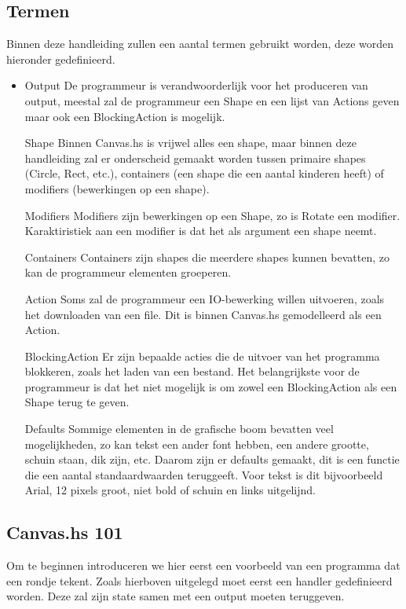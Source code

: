 \subsection{Termen}
Binnen deze handleiding zullen een aantal termen gebruikt worden, deze worden hieronder gedefinieerd.
\begin{itemize}
	\item Output
De programmeur is verandwoorderlijk voor het produceren van output, meestal zal de programmeur een Shape en een lijst van Actions geven maar ook een BlockingAction is mogelijk.
	\item[Shape]
Binnen Canvas.hs is vrijwel alles een shape, maar binnen deze handleiding zal er onderscheid gemaakt worden tussen primaire shapes (Circle, Rect, etc.), containers (een shape die een aantal kinderen heeft) of modifiers (bewerkingen op een shape).
	\item[Modifiers]
Modifiers zijn bewerkingen op een Shape, zo is Rotate een modifier. Karaktiristiek aan een modifier is dat het als argument een shape neemt.
	\item[Containers]
Containers zijn shapes die meerdere shapes kunnen bevatten, zo kan de programmeur elementen groeperen.
	\item[Action]
Soms zal de programmeur een IO-bewerking willen uitvoeren, zoals het downloaden van een file. Dit is binnen Canvas.hs gemodelleerd als een Action.
	\item[BlockingAction]
Er zijn bepaalde acties die de uitvoer van het programma blokkeren, zoals het laden van een bestand. Het belangrijkste voor de programmeur is dat het niet mogelijk is om zowel een BlockingAction als een Shape terug te geven. 
    \item[Defaults]
Sommige elementen in de grafische boom bevatten veel mogelijkheden, zo kan tekst een ander font hebben, een andere grootte, schuin staan, dik zijn, etc. Daarom zijn er defaults gemaakt, dit is een functie die een aantal standaardwaarden teruggeeft. Voor tekst is dit bijvoorbeeld Arial, 12 pixels groot, niet bold of schuin en links uitgelijnd.
\end{itemize}

\subsection{Canvas.hs 101}
Om te beginnen introduceren we hier eerst een voorbeeld van een programma dat een rondje tekent. Zoals hierboven uitgelegd moet eerst een handler gedefinieerd worden. Deze zal zijn state samen met een output moeten teruggeven.

